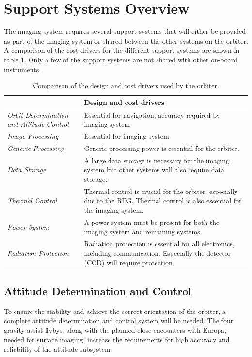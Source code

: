 \section{Support Systems Overview}
The imaging system requires several support systems that will either be provided as part of the imaging system or shared between the other systems on the orbiter. A comparison of the cost drivers for the different support systems are shown in table \ref{tab:design_cost_driver}. Only a few of the support systems are not shared with other on-board instruments.
\begin{table}[htb!]
  \centering
\begin{tabular}{p{4cm}|p{11cm}}
\toprule
      & \textbf{Design and cost drivers} \\
\midrule
\textit{Orbit Determination and Attitude Control} & Essential for navigation, accuracy required by imaging system \\
\textit{Image Processing} & Essential for imaging system \\
\textit{Generic Processing} & Generic processing power is essential for the orbiter. \\
\textit{Data Storage} & A large data storage is necessary for the imaging system but other systems will also require data storage. \\
\textit{Thermal Control} & Thermal control is crucial for the orbiter, especially due to the RTG. Thermal control is also essential for the imaging system. \\
\textit{Power System} & A power system must be present for both the imaging system and remaining systems. \\
\textit{Radiation Protection} & Radiation protection is essential for all electronics, including communication. Especially the detector (CCD) will require protection. \\
\bottomrule
\end{tabular}%
  \caption{Comparison of the design and cost drivers used by the orbiter.}
  \label{tab:design_cost_driver}%
\end{table}%
\subsection{Attitude Determination and Control}
To ensure the stability and achieve the correct orientation of the orbiter, a complete attitude determination and control system will be needed. The four gravity assist flybys, along with the planned close encounters with Europa, needed for surface imaging, increase the requirements for high accuracy and reliability of the attitude subsystem.

